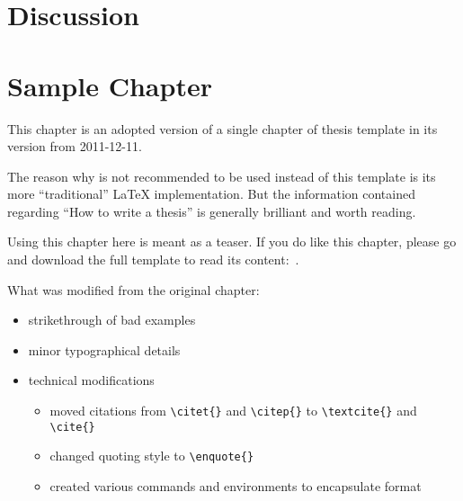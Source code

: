 \chapter{Discussion}

%
%
% 
% 
% 

\newenvironment{mykeithtabbing}[1]{%
\begin{tabular}{lp{0.9\hsize}}
}{%
\end{tabular}
}

\newcommand{\mybadgood}[2]{%
\begin{mykeithtabbing}
{}\emph{Bad:}  & \sout{#1}  \\
\emph{Good:}   & #2  \\
\end{mykeithtabbing}

}

\chapter{Sample Chapter}
\label{chap:Style}

\begin{framed}

  This chapter is an adopted version of a single chapter of
  \citeauthor{KeithThesis} thesis template \cite{KeithThesis} in its
  version from 2011-12-11.

  The reason why \cite{KeithThesis} is not recommended to be used instead
  of this template is its more \enquote{traditional} \LaTeX{}
  implementation. But the information contained regarding \enquote{How
    to write a thesis} is generally brilliant and worth reading.

  Using this chapter here is meant as a teaser. If you do like this
  chapter, please go and download the full template to read its
  content:~\cite{KeithThesis}.

  What was modified from the original chapter:
    \begin{itemize}
    \item strikethrough of bad examples
    \item minor typographical details
    \item technical modifications
      \begin{itemize}
      \item moved citations from \verb+\citet{}+ and
        \verb+\citep{}+ to \verb+\textcite{}+ and \verb+\cite{}+
      \item changed quoting style to \verb+\enquote{}+
      \item created various commands and environments to encapsulate
        format
      \end{itemize}
    \end{itemize}
\end{framed}


